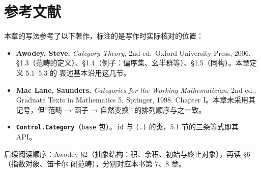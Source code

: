 \section*{参考文献}
\label{ux53c2ux8003ux6587ux732e}

本章的写法参考了以下著作，标注的是写作时实际核对的位置：

\begin{itemize}
\tightlist
\item
  \textbf{Awodey, Steve.} \emph{Category Theory}, 2nd ed.~Oxford University Press, 2006.
  §1.3（范畴的定义）、§1.4（例子：偏序集、幺半群等）、§1.5（同构）。本章定义 5.1--5.3 的
  表述基本沿用这几节。
\item
  \textbf{Mac Lane, Saunders.} \emph{Categories for the Working Mathematician}, 2nd ed., Graduate Texts
  in Mathematics 5, Springer, 1998. Chapter I。本章未采用其记号，但''范畴 → 函子 → 自然变换''
  的排列顺序与之一致。
\item
  \textbf{\passthrough{\lstinline!Control.Category!}}（\passthrough{\lstinline!base!} 包）。\passthrough{\lstinline!id!} 与 \passthrough{\lstinline!(.)!} 的类，5.1 节的三条等式即其 API。
\end{itemize}

后续阅读顺序：Awodey §2（抽象结构：积、余积、初始与终止对象），再读 §6（指数对象、笛卡尔
闭范畴），分别对应本书第 7、8 章。
